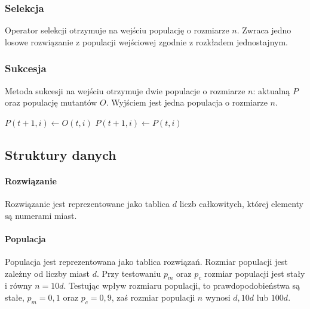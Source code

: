 \documentclass[12pt, a4paper]{article}
\begin{document}
\subsubsection{Selekcja}

Operator selekcji otrzymuje na wejściu populację o rozmiarze $n$. Zwraca jedno losowe rozwiązanie z populacji wejściowej
zgodnie z rozkładem jednostajnym.

\subsubsection{Sukcesja}

Metoda sukcesji na wejściu otrzymuje dwie populacje o rozmiarze $n$: aktualną $P$ oraz populację mutantów $O$.
Wyjściem jest jedna populacja o rozmiarze $n$.

\begin{algorithm}[!htb]
\begin{algorithmic}[1]
      \State $P(t+1, i) \gets O(t, i)$
    \Else
      \State $P(t+1, i) \gets P(t, i)$
    \EndIf
  \EndFor
\EndFunction
\end{algorithmic}
\end{algorithm}

\subsection{Struktury danych}
	\paragraph{Rozwiązanie}
		Rozwiązanie jest reprezentowane jako tablica $d$ liczb całkowitych, której elementy są numerami miast.
	\paragraph{Populacja}
		Populacja jest reprezentowana jako tablica rozwiązań. Rozmiar populacji
jest zależny od liczby miast $d$.
Przy testowaniu $p_m$ oraz $p_c$ rozmiar populacji jest stały i równy $n = 10d$.
Testując wpływ rozmiaru populacji, to prawdopodobieństwa są stałe, $p_m=0,1$ oraz $p_c=0,9$,
zaś rozmiar populacji $n$ wynosi $d, 10d$ lub $100d$.
\end{document}
